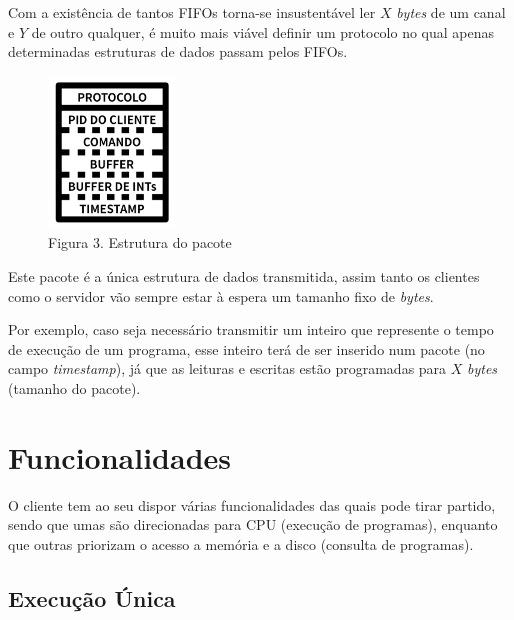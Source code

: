 \documentclass[12pt,a4paper]{report}
\begin{document}
        Com a existência de tantos FIFOs torna-se insustentável ler $X$ \textit{bytes} de um canal e $Y$ de outro qualquer, é muito mais viável definir um protocolo no qual apenas determinadas estruturas de dados passam pelos FIFOs.

        \begin{figure}
            \begin{center}
                \vspace{-22pt}
                \includegraphics[width=0.3\textwidth]{images/protocol.png}
                \caption*{Figura 3. Estrutura do pacote}
                \vspace{-30pt}
            \end{center}
        \end{figure}

        Este pacote é a única estrutura de dados transmitida, assim tanto os clientes como o servidor vão sempre estar à espera um tamanho fixo de \textit{bytes}.

        Por exemplo, caso seja necessário transmitir um inteiro que represente o tempo de execução de um programa, esse inteiro terá de ser inserido num pacote (no campo \textit{timestamp}), já que as leituras e escritas estão programadas para $X$ \textit{bytes} (tamanho do pacote).


\chapter{Funcionalidades}

    O cliente tem ao seu dispor várias funcionalidades das quais pode tirar partido, sendo que umas são direcionadas para CPU (execução de programas), enquanto que outras priorizam o acesso a memória e a disco (consulta de programas).

    \section{Execução Única}
\end{document}
